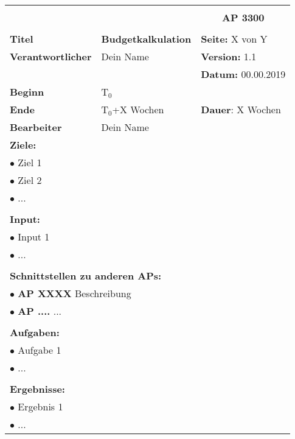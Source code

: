 \begin{table}[!h]
 \begin{center}
  \begin{tabular}{|p{35mm}||p{55mm}|p{50mm}||p{40mm}|}
   \hline
   \multicolumn{3}{|l||}{\textbf{}} & \multicolumn{1}{c|}{}\\
   \multicolumn{3}{|l||}{\textbf{}} & \multicolumn{1}{c|}{\textbf{AP 3300}}\\
   \multicolumn{3}{|l||}{\textbf{}} & \multicolumn{1}{c|}{}\\
   \hline\hline
   \textbf{Titel} & \multicolumn{2}{p{7cm}||}{\textbf{Budgetkalkulation}} & \textbf{Seite:} X von Y\\
   \hline
   \textbf{Verantwortlicher} & \multicolumn{2}{l||}{Dein Name} & \textbf{Version:} 1.1\\
   \hline
   \multicolumn{3}{|l||}{} & \textbf{Datum:} 00.00.2019\\
   \hline\hline
   \textbf{Beginn} & \multicolumn{2}{l||}{T$_0$} & \\
   \hline
   \textbf{Ende} & \multicolumn{2}{l||}{T$_0$+X Wochen} & \textbf{Dauer}: X Wochen\\
   \hline\hline
   \textbf{Bearbeiter} & \multicolumn{3}{l|}{Dein Name}\\
   \hline\hline
   \multicolumn{4}{|p{150mm}|}{\textbf{Ziele:}}\\
   \multicolumn{4}{|p{150mm}|}{$\bullet$ Ziel 1}\\
   \multicolumn{4}{|p{150mm}|}{$\bullet$ Ziel 2}\\
   \multicolumn{4}{|p{150mm}|}{$\bullet$ ...}\\
   \multicolumn{4}{|p{150mm}|}{}\\
   \multicolumn{4}{|p{150mm}|}{\textbf{Input:}}\\
   \multicolumn{4}{|p{150mm}|}{$\bullet$ Input 1}\\
   \multicolumn{4}{|p{150mm}|}{$\bullet$ ...}\\
   \multicolumn{4}{|p{150mm}|}{}\\
   \multicolumn{4}{|p{150mm}|}{\textbf{Schnittstellen zu anderen APs:}}\\
   \multicolumn{4}{|p{150mm}|}{$\bullet$ \textbf{AP XXXX} Beschreibung}\\
   \multicolumn{4}{|p{150mm}|}{$\bullet$ \textbf{AP ....} ...}\\
   \multicolumn{4}{|p{150mm}|}{}\\
   \multicolumn{4}{|p{150mm}|}{\textbf{Aufgaben:}}\\
   \multicolumn{4}{|p{150mm}|}{$\bullet$ Aufgabe 1}\\
   \multicolumn{4}{|p{150mm}|}{$\bullet$ ...}\\
   \multicolumn{4}{|p{150mm}|}{}\\
   \multicolumn{4}{|p{150mm}|}{\textbf{Ergebnisse:}}\\
   \multicolumn{4}{|p{150mm}|}{$\bullet$ Ergebnis 1}\\
   \multicolumn{4}{|p{150mm}|}{$\bullet$ ...}\\
   \hline
  \end{tabular}
 \end{center}
\end{table}

